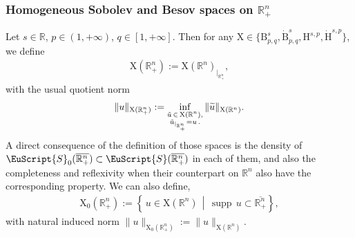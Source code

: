 \documentclass[10pt]{amsart}
\theoremstyle{definition}\newtheorem{defi}[theo]{Definition}\newtheorem{rema}[theo]{Remark}\newtheorem{exam}[theo]{Example}\newtheorem{exem}[theo]{Example}\newtheorem{nota}[theo]{Notation}
\DeclareMathOperator{\supp}{supp\,}
\newcommand{\bbR}{\mathbb{R}}
\newcommand{\rmH}{\mathrm{H}}%
\newcommand{\rmB}{\mathrm{B}}
\newcommand{\rmX}{\mathrm{X}}
\newcommand{\eus}{\EuScript}
\let\oldtilde\tilde
\renewcommand*{\tilde}[1]{\mathchoice{\widetilde{#1}}{\widetilde{#1}}{\oldtilde{#1}}{\oldtilde{#1}}}
\begin{document}
\subsubsection{Homogeneous Sobolev and Besov spaces on \texorpdfstring{$\bbR^n_+$}{Rn+}}\label{sec:FunctionSpacesRn+}


Let $s\in\bbR$, $p\in(1,+\infty)$, $q\in[1,+\infty]$. Then for any $\rmX \in\{\rmB^{s}_{p,q}, \dot{\rmB}^{s}_{p,q}, \rmH^{s,p}, \dot{\rmH}^{s,p}\}$, we define
\begin{align*}
\rmX (\bbR^n_+):= \rmX (\bbR^n)_{|_{\bbR^n_+}},
\end{align*}
with the usual quotient norm
\[
\| u \|_{\rmX (\bbR^n_+)}:= \inf\limits_{\substack{\Tilde{u}\,\in\,\rmX (\bbR^n),\\ \tilde{u}_{|_{\bbR^n_+}}=u\,.}} \| \Tilde{u} \|_{\rmX (\bbR^n)}. 
\]
A direct consequence of the definition of those spaces is the density of $\eus{S}_0(\overline{\bbR^n_+})\subset\eus{S}(\overline{\bbR^n_+})$ in each of them, and also the completeness and reflexivity when their counterpart on $\bbR^n$ also have the corresponding property. We can also define,
\begin{align*}
\rmX _0\left(\bbR^n_+\right):= \left\{\,u\in \rmX \left(\bbR^n\right) \,\middle|\, \supp u \subset \overline{\bbR^n_+} \right\},
\end{align*}
with natural induced norm $\| u \|_{\rmX _0(\bbR^n_+)}:= \| u \|_{\rmX (\bbR^n)}$.
\end{document}
